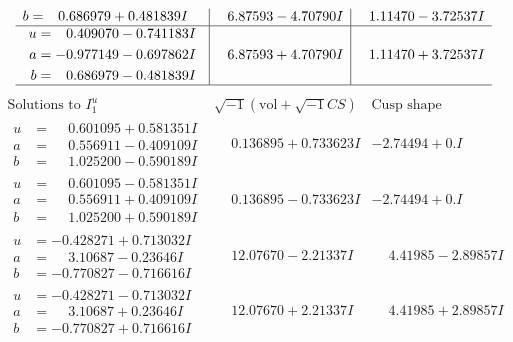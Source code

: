 \documentclass[1p]{elsarticle_modified}
\theoremstyle{definition}
\newcommand{\I}{\sqrt{-1}}
\begin{document}
$$\begin{array}{c|c|c}
\begin{aligned}
b &= \phantom{-}0.686979 + 0.481839 I\end{aligned}
 & \phantom{-}6.87593 - 4.70790 I & \phantom{-}1.11470 - 3.72537 I \\ \hline\begin{aligned}
u &= \phantom{-}0.409070 - 0.741183 I \\
a &= -0.977149 - 0.697862 I \\
b &= \phantom{-}0.686979 - 0.481839 I\end{aligned}
 & \phantom{-}6.87593 + 4.70790 I & \phantom{-}1.11470 + 3.72537 I\\
 \hline 
 \end{array}$$\newpage$$\begin{array}{c|c|c}  
\text{Solutions to }I^u_{1}& \I (\text{vol} + \sqrt{-1}CS) & \text{Cusp shape}\\
 \hline 
\begin{aligned}
u &= \phantom{-}0.601095 + 0.581351 I \\
a &= \phantom{-}0.556911 - 0.409109 I \\
b &= \phantom{-}1.025200 - 0.590189 I\end{aligned}
 & \phantom{-}0.136895 + 0.733623 I & -2.74494 + 0. I\phantom{ +0.000000I} \\ \hline\begin{aligned}
u &= \phantom{-}0.601095 - 0.581351 I \\
a &= \phantom{-}0.556911 + 0.409109 I \\
b &= \phantom{-}1.025200 + 0.590189 I\end{aligned}
 & \phantom{-}0.136895 - 0.733623 I & -2.74494 + 0. I\phantom{ +0.000000I} \\ \hline\begin{aligned}
u &= -0.428271 + 0.713032 I \\
a &= \phantom{-}3.10687 - 0.23646 I \\
b &= -0.770827 - 0.716616 I\end{aligned}
 & \phantom{-}12.07670 - 2.21337 I & \phantom{-}4.41985 - 2.89857 I \\ \hline\begin{aligned}
u &= -0.428271 - 0.713032 I \\
a &= \phantom{-}3.10687 + 0.23646 I \\
b &= -0.770827 + 0.716616 I\end{aligned}
 & \phantom{-}12.07670 + 2.21337 I & \phantom{-}4.41985 + 2.89857 I \\ \hline\begin{aligned}

\end{aligned}
\end{array}$$
\end{document}
